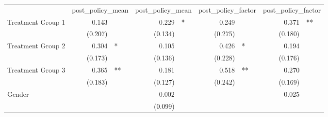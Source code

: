 \documentclass{article}
\begin{document}
\begin{table}[!h]
\centering
\begin{tabular}{lllllllll}
\cline{1-9}
\multicolumn{1}{r}{} &
  \multicolumn{2}{c}{post\_policy\_mean} &
  \multicolumn{2}{c}{post\_policy\_mean} &
  \multicolumn{2}{c}{post\_policy\_factor} &
  \multicolumn{2}{c}{post\_policy\_factor} \\
\cline{1-9}
\multicolumn{1}{l}{Treatment Group 1} &
  \multicolumn{1}{r}{0.143} &
  \multicolumn{1}{l}{} &
  \multicolumn{1}{r}{0.229} &
  \multicolumn{1}{l}{*} &
  \multicolumn{1}{r}{0.249} &
  \multicolumn{1}{l}{} &
  \multicolumn{1}{r}{0.371} &
  \multicolumn{1}{l}{**} \\
\multicolumn{1}{l}{} &
  \multicolumn{1}{r}{(0.207)} &
  \multicolumn{1}{l}{} &
  \multicolumn{1}{r}{(0.134)} &
  \multicolumn{1}{l}{} &
  \multicolumn{1}{r}{(0.275)} &
  \multicolumn{1}{l}{} &
  \multicolumn{1}{r}{(0.180)} &
  \multicolumn{1}{l}{} \\
\multicolumn{1}{l}{Treatment Group 2} &
  \multicolumn{1}{r}{0.304} &
  \multicolumn{1}{l}{*} &
  \multicolumn{1}{r}{0.105} &
  \multicolumn{1}{l}{} &
  \multicolumn{1}{r}{0.426} &
  \multicolumn{1}{l}{*} &
  \multicolumn{1}{r}{0.194} &
  \multicolumn{1}{l}{} \\
\multicolumn{1}{l}{} &
  \multicolumn{1}{r}{(0.173)} &
  \multicolumn{1}{l}{} &
  \multicolumn{1}{r}{(0.136)} &
  \multicolumn{1}{l}{} &
  \multicolumn{1}{r}{(0.228)} &
  \multicolumn{1}{l}{} &
  \multicolumn{1}{r}{(0.176)} &
  \multicolumn{1}{l}{} \\
\multicolumn{1}{l}{Treatment Group 3} &
  \multicolumn{1}{r}{0.365} &
  \multicolumn{1}{l}{**} &
  \multicolumn{1}{r}{0.181} &
  \multicolumn{1}{l}{} &
  \multicolumn{1}{r}{0.518} &
  \multicolumn{1}{l}{**} &
  \multicolumn{1}{r}{0.270} &
  \multicolumn{1}{l}{} \\
\multicolumn{1}{l}{} &
  \multicolumn{1}{r}{(0.183)} &
  \multicolumn{1}{l}{} &
  \multicolumn{1}{r}{(0.127)} &
  \multicolumn{1}{l}{} &
  \multicolumn{1}{r}{(0.242)} &
  \multicolumn{1}{l}{} &
  \multicolumn{1}{r}{(0.169)} &
  \multicolumn{1}{l}{} \\
\multicolumn{1}{l}{Gender} &
  \multicolumn{1}{r}{} &
  \multicolumn{1}{l}{} &
  \multicolumn{1}{r}{0.002} &
  \multicolumn{1}{l}{} &
  \multicolumn{1}{r}{} &
  \multicolumn{1}{l}{} &
  \multicolumn{1}{r}{0.025} &
  \multicolumn{1}{l}{} \\
\multicolumn{1}{l}{} &
  \multicolumn{1}{r}{} &
  \multicolumn{1}{l}{} &
  \multicolumn{1}{r}{(0.099)} &
  \multicolumn{1}{l}{} &
  \multicolumn{1}{r}{} &

\end{tabular}
\end{table}
\end{document}
